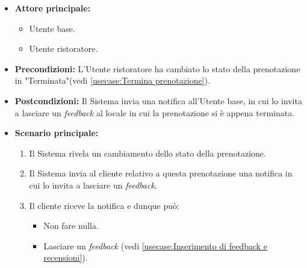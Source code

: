 \label{usecase:Notifica di inserimento di un feedback}
\begin{itemize}
	\item \textbf{Attore principale:} 
    \begin{itemize}
        \item Utente base.
        \item Utente ristoratore.
    \end{itemize} 
	
	\item \textbf{Precondizioni:} L'Utente ristoratore ha cambiato lo stato della prenotazione in "Terminata"(vedi \autoref{usecase:Termina prenotazione}).

    
	\item \textbf{Postcondizioni:} Il Sistema invia una notifica all'Utente base, in cui lo invita a lasciare un \textit{feedback} al locale in cui la prenotazione si è appena terminata.
     
	\item \textbf{Scenario principale:}
	      \begin{enumerate}
                \item Il Sistema rivela un cambiamento dello stato della prenotazione.
                \item Il Sistema invia al cliente relativo a questa prenotazione una notifica in cui lo invita a lasciare un \textit{feedback}.
                \item Il cliente riceve la notifica e dunque può:
                \begin{itemize}
                    \item Non fare nulla.
                    \item Lasciare un \textit{feedback} (vedi \autoref{usecase:Inserimento di feedback e recensioni}).
                \end{itemize}
	      \end{enumerate}
\end{itemize}